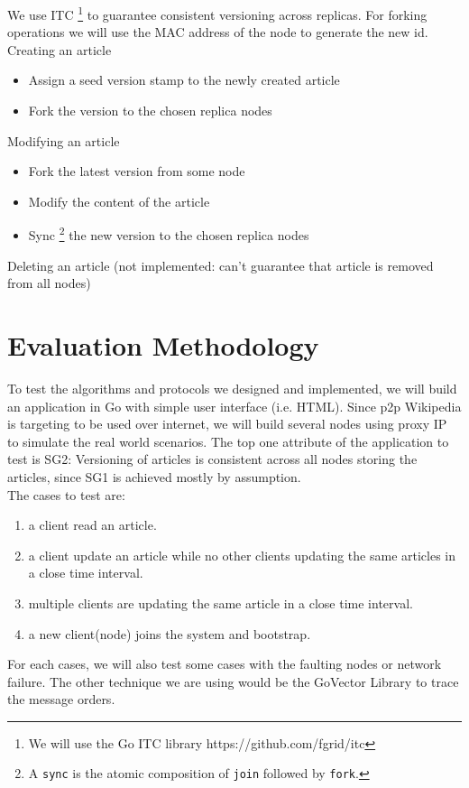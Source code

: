 \documentclass{article}
\begin{document}
We use ITC \footnote{We will use the Go ITC library https://github.com/fgrid/itc} to guarantee
consistent versioning across replicas. For forking operations we will use the MAC
address of the node to generate the new id. \\

\noindent
Creating an article
\begin{itemize}[label={}]
  \item Assign a seed version stamp to the newly created article
  \item Fork the version to the chosen replica nodes
\end{itemize}

\noindent
Modifying an article
\begin{itemize}[label={}]
  \item Fork the latest version from some node
  \item Modify the content of the article
  \item Sync \footnote{A \texttt{sync} is the atomic composition of \texttt{join}
  followed by \texttt{fork}.} the new version to the chosen replica nodes
\end{itemize}

\noindent
Deleting an article (not implemented: can't guarantee that article is removed
from all nodes)

\section{Evaluation Methodology}
To test the algorithms and protocols we designed and implemented, we will build
an application in Go with simple user interface (i.e. HTML). Since p2p Wikipedia
is targeting to be used over internet, we will build several nodes using proxy IP
to simulate the real world scenarios. The top one attribute of the application to
test is SG2: Versioning of articles is consistent across all nodes storing the
articles, since SG1 is achieved mostly by assumption. \\

\noindent
The cases to test are:
\begin{enumerate}
  \item a client read an article.
  \item a client update an article while no other clients updating the same articles in a close time interval.
  \item multiple clients are updating the same article in a close time interval.
  \item a new client(node) joins the system and bootstrap.
\end{enumerate}
For each cases, we will also test some cases with the faulting nodes or network failure.
The other technique we are using would be the GoVector Library to trace the message orders.
\end{document}

